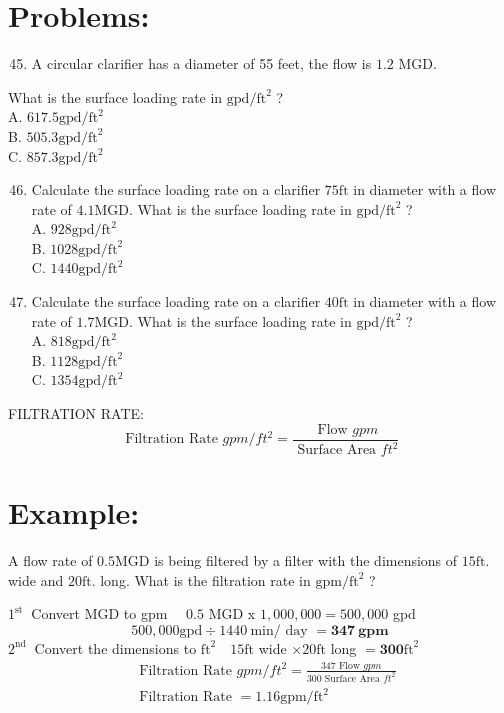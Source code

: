 \documentclass[10pt]{article}
\begin{document}
\section{Problems:}
\begin{enumerate}
  \setcounter{enumi}{44}
  \item A circular clarifier has a diameter of 55 feet, the flow is $1.2$ MGD.
\end{enumerate}
What is the surface loading rate in $\mathrm{gpd} / \mathrm{ft}^{2}$ ?\\
A. $617.5 \mathrm{gpd} / \mathrm{ft}^{2}$\\
B. $505.3 \mathrm{gpd} / \mathrm{ft}^{2}$\\
C. $857.3 \mathrm{gpd} / \mathrm{ft}^{2}$

\begin{enumerate}
  \setcounter{enumi}{45}
  \item Calculate the surface loading rate on a clarifier $75 \mathrm{ft}$ in diameter with a flow rate of $4.1 \mathrm{MGD}$. What is the surface loading rate in $\mathrm{gpd} / \mathrm{ft}^{2}$ ?\\
A. $928 \mathrm{gpd} / \mathrm{ft}^{2}$\\
B. $1028 \mathrm{gpd} / \mathrm{ft}^{2}$\\
C. $1440 \mathrm{gpd} / \mathrm{ft}^{2}$

  \item Calculate the surface loading rate on a clarifier $40 \mathrm{ft}$ in diameter with a flow rate of $1.7 \mathrm{MGD}$. What is the surface loading rate in $\mathrm{gpd} / \mathrm{ft}^{2}$ ?\\
A. $818 \mathrm{gpd} / \mathrm{ft}^{2}$\\
B. $1128 \mathrm{gpd} / \mathrm{ft}^{2}$\\
C. $1354 \mathrm{gpd} / \mathrm{ft}^{2}$

\end{enumerate}
FILTRATION RATE:
$$
\text { Filtration Rate } g p m / f t^{2}=\frac{\text { Flow } g p m}{\text { Surface Area } f t^{2}}
$$

\section{Example:}
A flow rate of $0.5 \mathrm{MGD}$ is being filtered by a filter with the dimensions of $15 \mathrm{ft}$. wide and $20 \mathrm{ft}$. long. What is the filtration rate in $\mathrm{gpm} / \mathrm{ft}^{2}$ ?

$1^{\text {st }}$ Convert MGD to gpm $\quad 0.5$ MGD x $1,000,000=500,000$ gpd
$$
500,000 \mathrm{gpd} \div 1440 \mathrm{~min} / \text { day }=\mathbf{3 4 7} \mathbf{~ g p m}
$$
$2^{\text {nd }}$ Convert the dimensions to $\mathrm{ft}^{2} \quad 15 \mathrm{ft}$ wide $\times 20 \mathrm{ft}$ long $=\mathbf{3 0 0} \mathrm{ft}^{2}$
$$
\begin{aligned}
& \text { Filtration Rate } g p m / f t^{2}=\frac{347 \text { Flow } g p m}{300 \text { Surface Area } f t^{2}} \\
& \text { Filtration Rate }=1.16 \mathrm{gpm} / \mathrm{ft}^{2}
\end{aligned}
$$
\end{document}
